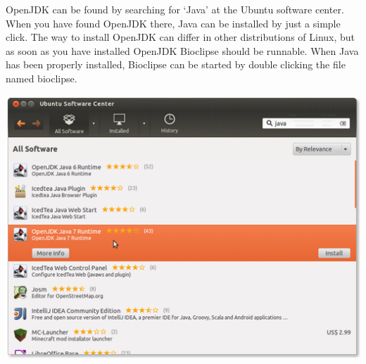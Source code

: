 \documentclass[a5paper, 10pt]{memoir}
\begin{document}
\begin{refsection}
OpenJDK can be found by searching for `Java' at the Ubuntu software center.
When you have found OpenJDK there, Java can be installed by just a simple
click. The way to install OpenJDK can differ in other distributions of Linux,
but as soon as you have installed OpenJDK Bioclipse should be runnable. When
Java has been properly installed, Bioclipse can be started by double clicking
the file named bioclipse.
\vfill
\begin{center}
\includegraphics[width=1\textwidth]{images/Java7onUbuntu.png}
\end{center}
\vfill\vfill


\end{refsection}
\end{document}
